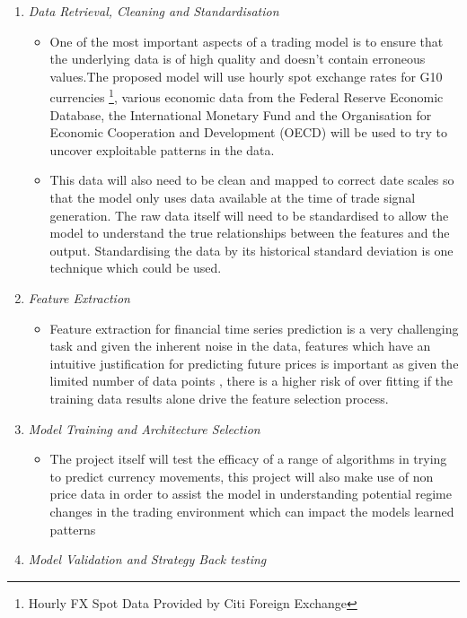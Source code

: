 \documentclass[12pt, a4paper]{article}
\begin{document}
\begin{enumerate}
  \item \textit{Data Retrieval, Cleaning and Standardisation}
\begin{itemize}
\item One of the most important aspects of a trading model is to ensure that the underlying data is of high quality and doesn't contain erroneous values.The proposed model will use hourly spot exchange rates for G10 currencies \footnote{Hourly FX Spot Data Provided by Citi Foreign Exchange}, various economic data from the Federal Reserve Economic Database, the International Monetary Fund and the Organisation for Economic Cooperation and Development  (OECD) will be used to try to uncover exploitable patterns in the data. 
\item This data will also need to be clean and mapped to correct date scales so that the model only uses data available at the time of trade signal generation. The raw data itself will need to be standardised to allow the model to understand the true relationships between the features and the output. Standardising the data by its historical standard deviation is one technique which could be used. 
\end{itemize}
  \item \textit{Feature Extraction}
	\begin{itemize}
	\item Feature extraction for financial time series prediction is a very challenging task and given the inherent noise in the data, features which have an intuitive justification for predicting future prices is important as given the limited number of data points , there is a higher risk of over fitting if the training data results alone drive the feature selection process. 
	\end{itemize}
  \item \textit{Model Training and Architecture Selection}
	\begin{itemize}
	\item The project itself will test the efficacy of a range of algorithms in trying to predict currency movements, this project will also make use of non price data in order to assist the model in understanding potential regime changes in the trading environment which can impact the models learned patterns 
	\end{itemize}
  \item \textit{Model Validation and Strategy Back testing}
	\begin{itemize}

\end{itemize}
\end{enumerate}
\end{document}
